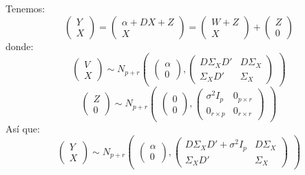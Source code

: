 \documentclass[11pt,a4paper]{article}
\begin{document}
\begin{enumerate}[label=\arabic*.]
\begin{enumerate}[label=\alph*)]
Tenemos:
$$\begin{pmatrix} Y \\ X \end{pmatrix} = \begin{pmatrix} \alpha + DX + Z \\ X \end{pmatrix} = \begin{pmatrix} W + Z \\ X \end{pmatrix} + \begin{pmatrix} Z \\ 0 \end{pmatrix}$$
donde:
$$\begin{pmatrix} V \\ X \end{pmatrix} \sim N_{p+r} \begin{pmatrix}\begin{pmatrix} \alpha \\ 0 \end{pmatrix}, \begin{pmatrix}
D\Sigma_{X}D' & D\Sigma_{X} \\
\Sigma_{X}D' & \Sigma_{X}
\end{pmatrix} \end{pmatrix}$$
$$\begin{pmatrix} Z \\ 0 \end{pmatrix} \sim N_{p+r} \begin{pmatrix} \begin{pmatrix} 0 \\ 0 \end{pmatrix}, \begin{pmatrix}
\sigma^{2}I_{p} & 0_{p \times r} \\
0_{r \times p} & 0_{r \times r}
\end{pmatrix} \end{pmatrix}$$
Así que:
$$\begin{pmatrix} Y \\ X \end{pmatrix} \sim N_{p + r} \begin{pmatrix} \begin{pmatrix} \alpha \\ 0 \end{pmatrix}, \begin{pmatrix}
D\Sigma_{X}D' + \sigma^{2}I_{p} & D\Sigma_{X} \\
\Sigma_{X}D' & \Sigma_{X}
\end{pmatrix} \end{pmatrix}$$


\end{enumerate}
\end{enumerate}
\end{document}
